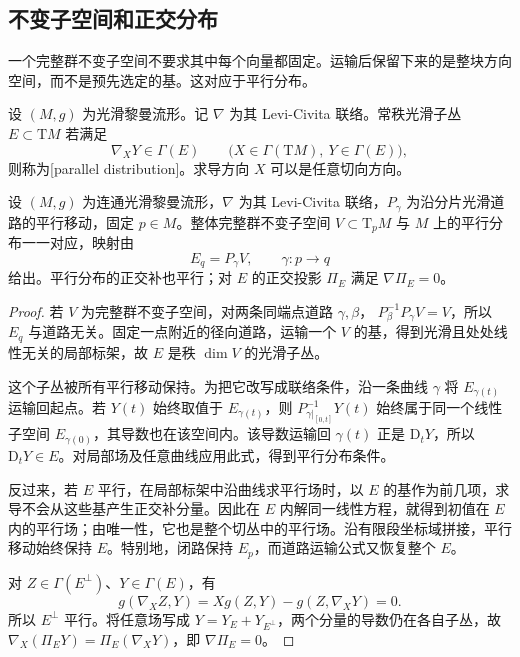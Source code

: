 \subsection{不变子空间和正交分布}
\label{g3:subsec:0502:02}

一个完整群不变子空间不要求其中每个向量都固定。运输后保留下来的是整块方向空间，而不是预先选定的基。这对应于平行分布。

\begin{definition}\label{g3:def:parallel-distribution}
	设 \((M,g)\) 为光滑黎曼流形。记 \(\nabla\) 为其 Levi-Civita 联络。常秩光滑子丛 \(E\subset\mathrm{T}M\) 若满足
	\[
		\nabla_XY\in\Gamma(E)
		\qquad
		\bigl(X\in\Gamma(\mathrm{T}M),\ Y\in\Gamma(E)\bigr),
	\]
	则称为[parallel distribution]。求导方向 \(X\) 可以是任意切向方向。
\end{definition}

\begin{proposition}\label{g3:prop:parallel-invariant-distributions}
	设 \((M,g)\) 为连通光滑黎曼流形，\(\nabla\) 为其 Levi-Civita 联络，\(P_\gamma\) 为沿分片光滑道路的平行移动，固定 \(p\in M\)。整体完整群不变子空间 \(V\subset\mathrm{T}_pM\) 与 \(M\) 上的平行分布一一对应，映射由
	\[
		E_q=P_\gamma V,\qquad \gamma:p\longrightarrow q
	\]
	给出。平行分布的正交补也平行；对 \(E\) 的正交投影 \(\Pi_E\) 满足 \(\nabla\Pi_E=0\)。
\end{proposition}
\begin{proof}
	若 \(V\) 为完整群不变子空间，对两条同端点道路 \(\gamma,\beta\)，
	\(P_\beta^{-1}P_\gamma V=V\)，所以 \(E_q\) 与道路无关。固定一点附近的径向道路，运输一个 \(V\) 的基，得到光滑且处处线性无关的局部标架，故 \(E\) 是秩 \(\dim V\) 的光滑子丛。

	这个子丛被所有平行移动保持。为把它改写成联络条件，沿一条曲线 \(\gamma\) 将 \(E_{\gamma(t)}\) 运输回起点。若 \(Y(t)\) 始终取值于 \(E_{\gamma(t)}\)，则 \(P_{\gamma|_{[0,t]}}^{-1}Y(t)\) 始终属于同一个线性子空间 \(E_{\gamma(0)}\)，其导数也在该空间内。该导数运输回 \(\gamma(t)\) 正是 \(\mathrm D_tY\)，所以 \(\mathrm D_tY\in E\)。对局部场及任意曲线应用此式，得到平行分布条件。

	反过来，若 \(E\) 平行，在局部标架中沿曲线求平行场时，以 \(E\) 的基作为前几项，求导不会从这些基产生正交补分量。因此在 \(E\) 内解同一线性方程，就得到初值在 \(E\) 内的平行场；由唯一性，它也是整个切丛中的平行场。沿有限段坐标域拼接，平行移动始终保持 \(E\)。特别地，闭路保持 \(E_p\)，而道路运输公式又恢复整个 \(E\)。

	对 \(Z\in\Gamma(E^\perp)\)、\(Y\in\Gamma(E)\)，有
	\[
		g(\nabla_XZ,Y)=Xg(Z,Y)-g(Z,\nabla_XY)=0.
	\]
	所以 \(E^\perp\) 平行。将任意场写成 \(Y=Y_E+Y_{E^\perp}\)，两个分量的导数仍在各自子丛，故
	\(\nabla_X(\Pi_EY)=\Pi_E(\nabla_XY)\)，即 \(\nabla\Pi_E=0\)。
\end{proof}

